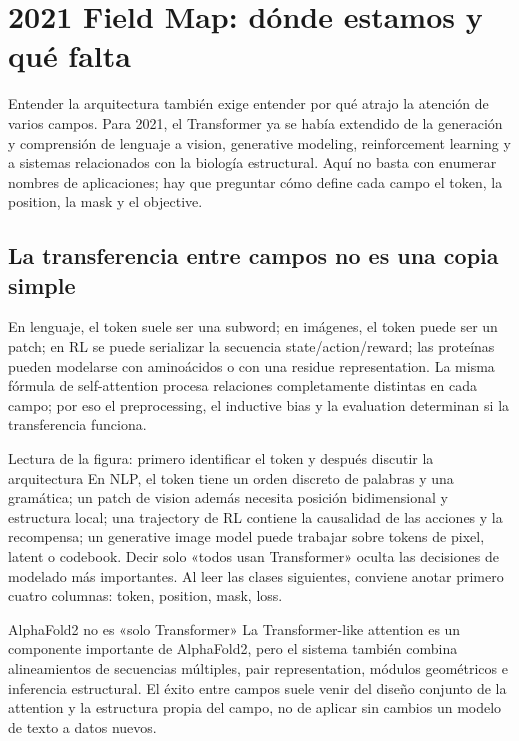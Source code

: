 \section{2021 Field Map: dónde estamos y qué falta}

Entender la arquitectura también exige entender por qué atrajo la atención de varios campos. Para 2021, el Transformer ya se había extendido de la generación y comprensión de lenguaje a vision, generative modeling, reinforcement learning y a sistemas relacionados con la biología estructural. Aquí no basta con enumerar nombres de aplicaciones; hay que preguntar cómo define cada campo el token, la position, la mask y el objective.

\subsection{La transferencia entre campos no es una copia simple}

En lenguaje, el token suele ser una subword; en imágenes, el token puede ser un patch; en RL se puede serializar la secuencia state/action/reward; las proteínas pueden modelarse con aminoácidos o con una residue representation. La misma fórmula de self-attention procesa relaciones completamente distintas en cada campo; por eso el preprocessing, el inductive bias y la evaluation determinan si la transferencia funciona.


\begin{knowledgebox}{Lectura de la figura: primero identificar el token y después discutir la arquitectura}
En NLP, el token tiene un orden discreto de palabras y una gramática; un patch de vision además necesita posición bidimensional y estructura local; una trajectory de RL contiene la causalidad de las acciones y la recompensa; un generative image model puede trabajar sobre tokens de pixel, latent o codebook. Decir solo «todos usan Transformer» oculta las decisiones de modelado más importantes. Al leer las clases siguientes, conviene anotar primero cuatro columnas: token, position, mask, loss.
\end{knowledgebox}

\begin{warningbox}{AlphaFold2 no es «solo Transformer»}
La Transformer-like attention es un componente importante de AlphaFold2, pero el sistema también combina alineamientos de secuencias múltiples, pair representation, módulos geométricos e inferencia estructural. El éxito entre campos suele venir del diseño conjunto de la attention y la estructura propia del campo, no de aplicar sin cambios un modelo de texto a datos nuevos.
\end{warningbox}

